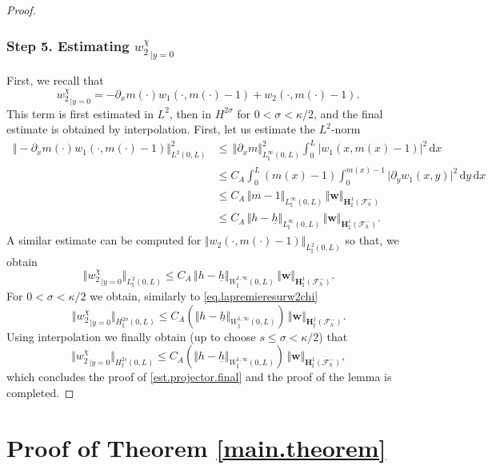 \documentclass[11pt]{article}
\let\mathcal\mathscr
\theoremstyle{remark}
\theoremstyle{definition}
\newcommand{\norme}[1]{\,\Vert #1\Vert}
\newcommand{\vnorme}[1]{\Vert #1\Vert}
\newcommand{\bnorme}[1]{\,\bigl\Vert #1\bigr\Vert}
\newcommand{\dd}{\,\mathrm{d}}
\newcommand{\wg}{\boldsymbol{w}}
\newcommand{\BS}[1]{\boldsymbol{#1}}
\newcommand{\hb}{{\underline{h}}}
\begin{document}
\begin{proof}
\subsubsection*{Step 5. Estimating ${w_{2}^\chi}_{|y=0}$}
First, we recall that
\[
{w_{2}^\chi}_{|{y=0}}=-\partial_x m(\cdot)w_{1}(\cdot,m(\cdot)-1)+w_{2}(\cdot,m(\cdot)-1).
\]
This term is first estimated in $L^2$, then in $H^{2\sigma}$ for $0<\sigma< \kappa/2$, and the final estimate is obtained by interpolation. First, let us estimate the $L^{2}$-norm
\[
\begin{aligned}
\norme{-\partial_x m(\cdot)w_{1}(\cdot,m(\cdot)-1)}_{L^{2}(0,L)}^{2}&{}\leq \norme{\partial_x m}_{L^{\infty}_{\sharp}(0,L)}^{2}\int_{0}^{L}\vert w_{1}(x,m(x)-1)\vert^{2}\dd x\\
&\leq C_{A}\int_{0}^{L}(m(x)-1)\int_{0}^{m(x)-1}\vert\partial_yw_{1}(x,y)\vert^{2}\dd y\dd x\\
&\leq C_{A}\norme{m-1}_{L^{\infty}_{\sharp}(0,L)}\norme{\wg}_{\BS{H}^{1}_{\sharp}(\mathcal{F}^{-}_{h})}\\
&\leq C_{A}\norme{h-\hb}_{L^{\infty}_{\sharp}(0,L)}\norme{\wg}_{\BS{H}^{1}_{\sharp}(\mathcal{F}^{-}_{h})}.
\end{aligned}\]
A similar estimate can be computed for $\vnorme{w_{2}(\cdot,m(\cdot)-1)}_{L^{2}_{\sharp}(0,L)}$ so that, we obtain
\[\bnorme{{w_{2}^\chi}_{|{y=0}}}_{{L}^{2}_{\sharp}(0,L)}\leq C_A\norme{h-\hb}_{W^{1,\infty}_{\sharp}(0,L)}\norme{\wg}_{\BS{H}^{1}_{\sharp}(\mathcal{F}^{-}_{h})}.\]
For $0<\sigma< \kappa/2$ we obtain, similarly to \eqref{eq.lapremieresurw2chi}
\[
\bnorme{{w_{2}^\chi}_{|{y=0}}}_{{H}^{2\sigma}_{\sharp}(0,L)} \leq C_A(\vnorme{h-\hb}_{W^{1,\infty}_{\sharp}(0,L)})\norme{\wg}_{\BS{H}^{1}_{\sharp}(\mathcal{F}^{-}_{h})}.\]
Using interpolation we finally obtain (up to choose $s \leq \sigma < \kappa/2$) that
\[\bnorme{{w_{2}^\chi}_{|{y=0}}}_{H^{2s}_{\sharp}(0,L)}\leq C_A(\vnorme{h-\hb}_{W^{1,\infty}_{\sharp}(0,L)})\norme{\wg}_{\BS{H}^{1}_{\sharp}(\mathcal{F}^{-}_{h})},\]
which concludes the proof of \eqref{est.projector.final} and the proof of the lemma is completed.
\end{proof}

\section{Proof of Theorem \ref{main.theorem}}
\end{document}
